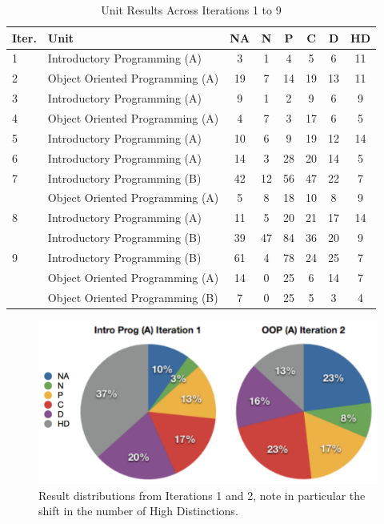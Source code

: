 \begin{table}[p]
  \footnotesize
  \renewcommand{\arraystretch}{1.3}
  \caption{Unit Results Across Iterations 1 to 9}
  \label{tbl:unit_results}
  \centering
    \begin{tabular}{l|l|c|c|c|c|c|c}
        Iter. & Unit    & NA & N  & P  & C  & D  & HD \\ \hline
        1         & Introductory Programming (A)  & 3  & 1  & 4  & 5  & 6  & 11 \\ \hline
        2         & Object Oriented Programming (A) & 19 & 7  & 14 & 19 & 13 & 11 \\ \hline
        3         & Introductory Programming (A)  & 9  & 1  & 2  & 9  & 6  & 9  \\ \hline
        4         & Object Oriented Programming (A) & 4  & 7  & 3  & 17 & 6  & 5  \\ \hline
        5         & Introductory Programming (A)  & 10 & 6  & 9  & 19 & 12 & 14 \\ \hline
        6         & Introductory Programming (A)  & 14 & 3  & 28 & 20 & 14 & 5  \\ \hline
        7         & Introductory Programming (B)  & 42 & 12 & 56 & 47 & 22 & 7  \\ 
        ~         & Object Oriented Programming (A) & 5  & 8  & 18 & 10 & 8  & 9  \\ \hline
        8         & Introductory Programming (A)  & 11 & 5  & 20 & 21 & 17 & 14 \\ 
        ~         & Introductory Programming (B)  & 39 & 47 & 84 & 36 & 20 & 9  \\ \hline
        9         & Introductory Programming (B)  & 61 & 4  & 78 & 24 & 25 & 7  \\ 
        ~         & Object Oriented Programming (A) & 14 & 0  & 25 & 6  & 14 & 7  \\ 
        ~         & Object Oriented Programming (B) & 7  & 0  & 25 & 5  & 3  & 4  
    \end{tabular}
\end{table}

\begin{figure}[p]
  \centering
  \includegraphics[width=0.8\columnwidth]{Iterations1_2}
  \caption{Result distributions from Iterations 1 and 2, note in particular the shift in the number of High Distinctions.}
  \label{fig:iterations_1_2}
\end{figure}

